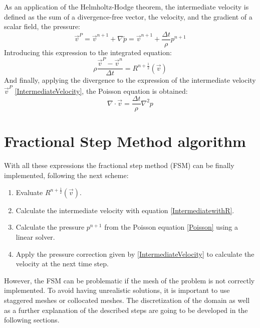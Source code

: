 As an application of the Helmholtz-Hodge theorem, the intermediate velocity is defined as the sum of a divergence-free vector, the velocity, and the gradient of a scalar field, the pressure:
\begin{equation}
\vec{v}^{P}=\vec{v}^{n+1}+\nabla\tilde{p}=\vec{v}^{n+1}+\frac{\Delta t}{\rho}p^{n+1}
\label{IntermediateVelocity}
\end{equation}
Introducing this expression to the integrated equation:
\begin{equation}
\rho\frac{\vec{v}^{P}-\vec{v}^{n}}{\Delta t}=R^{n+\frac{1}{2}}\left(\vec{v}\right)
\label{IntermediatewithR}
\end{equation}
And finally, applying the divergence to the expression of the intermediate velocity $\vec{v}^{P}$ \ref{IntermediateVelocity}, the Poisson equation is obtained:
\begin{equation}
\nabla\cdot\vec{v}=\frac{\Delta t}{\rho}\nabla^{2}p
\label{Poisson}
\end{equation}

\section{Fractional Step Method algorithm}
With all these expressions the fractional step method (FSM) can be finally implemented, following the next scheme:
\begin{enumerate}
	\item Evaluate $R^{n+\frac{1}{2}}\left(\vec{v}\right)$.
	\item Calculate the intermediate velocity with equation \ref{IntermediatewithR}.
	\item Calculate the pressure $p^{n+1}$ from the Poisson equation \ref{Poisson} using a linear solver.
	\item Apply the pressure correction given by \ref{IntermediateVelocity} to calculate the velocity at the next time step.
\end{enumerate}
However, the FSM can be problematic if the mesh of the problem is not correctly implemented. To avoid having unrealistic solutions, it is important to use staggered meshes or collocated meshes. The discretization of the domain as well as a further explanation of the described steps are going to be developed in the following sections.

